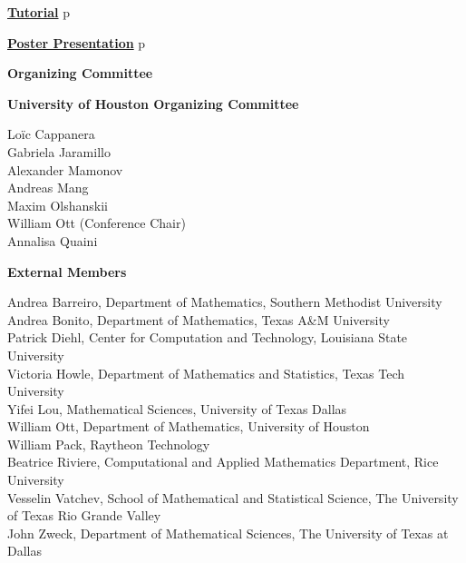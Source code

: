 \noindent\hyperref[tutorial]{{\bfseries\large  Tutorial}}%
\dotfill{}p\pageref{tutorial}
\vspace{3ex}

\noindent\hyperref[poster]{{\bfseries\large  Poster Presentation}}
\dotfill{}p\pageref{poster}

\newpage\newpage
\thispagestyle{empty}
\newpage
\clearpage


\thispagestyle{empty}
\label{committee}
\centerline{\bfseries\Large Organizing Committee}
\vspace{10ex}

\noindent
{\bfseries\large  University of Houston Organizing Committee}
\vspace{1ex}

\noindent
Loïc Cappanera\\
Gabriela Jaramillo\\
Alexander Mamonov\\
Andreas Mang\\
Maxim Olshanskii\\
William Ott (Conference Chair)\\
Annalisa Quaini

\vspace{4ex}

\noindent
{\bfseries\large  External Members}

\vspace{1ex}

\noindent
Andrea Barreiro, Department of Mathematics, Southern Methodist University\\
Andrea Bonito, Department of Mathematics, Texas A\&M University\\
Patrick Diehl, Center for Computation and Technology, Louisiana State University\\
Victoria Howle, Department of Mathematics and Statistics, Texas Tech University\\
Yifei Lou, Mathematical Sciences, University of Texas Dallas\\
William Ott, Department of Mathematics, University of Houston\\
William Pack, Raytheon Technology\\
Beatrice Riviere, Computational and Applied Mathematics Department, Rice University\\
Vesselin Vatchev, School of Mathematical and Statistical Science, The University of Texas Rio Grande Valley\\
John Zweck, Department of Mathematical Sciences, The University of Texas at Dallas\\


\clearpage
